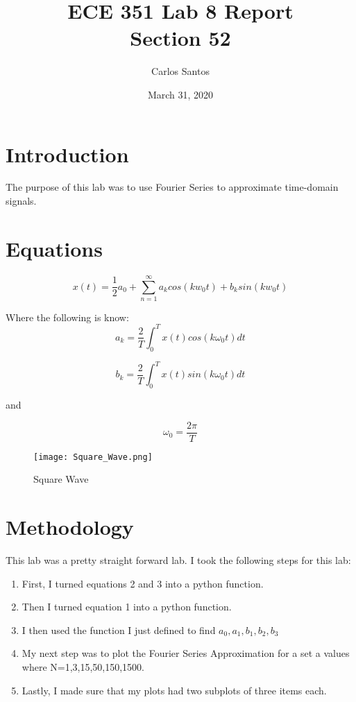 \documentclass[12pt]{article}
\title{ECE 351 Lab 8 Report \\ Section 52}
\date{March 31, 2020}
\author{Carlos Santos}
\begin{document}
\vspace{\fill}
\maketitle
\vspace{\fill}
\clearpage

\maketitle
\tableofcontents


\section{Introduction}
The purpose of this lab was to use Fourier Series to approximate time-domain signals.

\section{Equations}

\begin{equation}
    x(t) = \frac{1}{2}a_0 + \sum_{n=1}^{\infty} a_k cos(kw_0 t) + b_k sin(kw_0 t)
\end{equation}

Where the following is know:
\begin{equation}
     a_k = \frac{2}{T} \int_{0}^{T} x(t)cos(k\omega _0 t) dt
\end{equation}

\begin{equation}
    b_k = \frac{2}{T} \int_{0}^{T} x(t)sin(k\omega _0 t) dt
\end{equation}

and

\begin{equation}
    \omega _0 = \frac{2 \pi}{T}
\end{equation}

\begin{figure}[H]
\caption{Square Wave}
\centering
\texttt{[image: Square\_Wave.png]}
\end{figure}

\section{Methodology}
This lab was a pretty straight forward lab. I took the following steps for this lab:
\begin{enumerate}
    \item First, I turned equations 2 and 3 into a python function.
    \item Then I turned equation 1 into a python function.
    \item I then used the function I just defined to find ${a_0,a_1,b_1,b_2,b_3}$
    \item My next step was to plot the Fourier Series Approximation for a set a values where N=1,3,15,50,150,1500.
    \item Lastly, I made sure that my plots had two subplots of three items each.
\end{enumerate}
\end{document}
